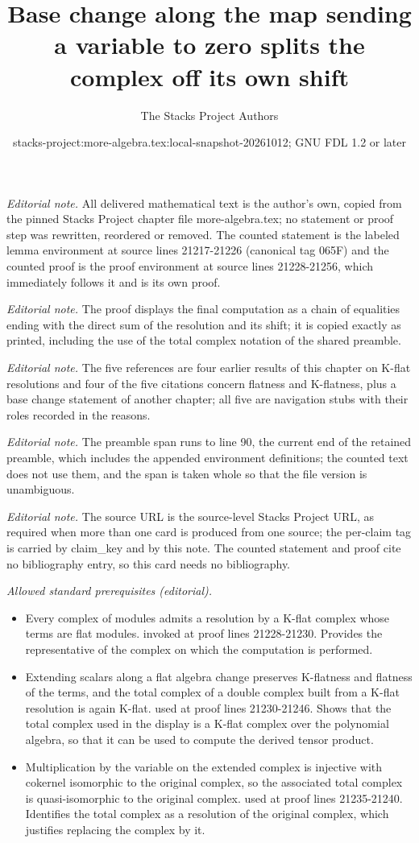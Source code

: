 \documentclass[10pt,a4paper]{amsart}
\title{Base change along the map sending a variable to zero splits the complex off its own shift}
\author{The Stacks Project Authors}
\date{stacks-project:more-algebra.tex:local-snapshot-20261012; GNU FDL 1.2 or later}
\theoremstyle{plain}
\theoremstyle{definition}
\theoremstyle{remark}
\numberwithin{equation}{subsection}
\begin{document}
\maketitle
\setcounter{subsection}{1}
\noindent\textit{Editorial note.} All delivered mathematical text is the author's own, copied from the pinned Stacks Project chapter file more-algebra.tex; no statement or proof step was rewritten, reordered or removed. The counted statement is the labeled lemma environment at source lines 21217-21226 (canonical tag 065F) and the counted proof is the proof environment at source lines 21228-21256, which immediately follows it and is its own proof.\par\medskip
\noindent\textit{Editorial note.} The proof displays the final computation as a chain of equalities ending with the direct sum of the resolution and its shift; it is copied exactly as printed, including the use of the total complex notation of the shared preamble.\par\medskip
\noindent\textit{Editorial note.} The five references are four earlier results of this chapter on K-flat resolutions and four of the five citations concern flatness and K-flatness, plus a base change statement of another chapter; all five are navigation stubs with their roles recorded in the reasons.\par\medskip
\noindent\textit{Editorial note.} The preamble span runs to line 90, the current end of the retained preamble, which includes the appended environment definitions; the counted text does not use them, and the span is taken whole so that the file version is unambiguous.\par\medskip
\noindent\textit{Editorial note.} The source URL is the source-level Stacks Project URL, as required when more than one card is produced from one source; the per-claim tag is carried by claim\_key and by this note. The counted statement and proof cite no bibliography entry, so this card needs no bibliography.\par\medskip
\noindent\textit{Allowed standard prerequisites (editorial).}\begin{itemize}
\item Every complex of modules admits a resolution by a K-flat complex whose terms are flat modules. invoked at proof lines 21228-21230. Provides the representative of the complex on which the computation is performed.
\item Extending scalars along a flat algebra change preserves K-flatness and flatness of the terms, and the total complex of a double complex built from a K-flat resolution is again K-flat. used at proof lines 21230-21246. Shows that the total complex used in the display is a K-flat complex over the polynomial algebra, so that it can be used to compute the derived tensor product.
\item Multiplication by the variable on the extended complex is injective with cokernel isomorphic to the original complex, so the associated total complex is quasi-isomorphic to the original complex. used at proof lines 21235-21240. Identifies the total complex as a resolution of the original complex, which justifies replacing the complex by it.
\end{itemize}\medskip
\end{document}
